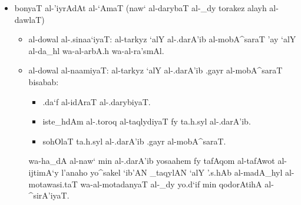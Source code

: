 \begin{itemize}
    \item bonyaT al-'iyrAdAt al-`AmaT (naw` al-darybaT al-_dy torakez alayh
        al-dawlaT)
    \begin{itemize}
        \item al-dowal al-.sinaa`iyaT: al-tarkyz `alY al-.darA'ib 
            al-mobA^saraT 'ay `alY al-da_hl wa-al-arbA.h wa-al-ra'smAl.
        \item al-dowal al-naamiyaT: al-tarkyz `alY al-.darA'ib .gayr
            al-mobA^saraT bisabab:
            \begin{itemize}
                \item .da`f al-idAraT al-.darybiyaT.
                \item iste_hdAm al-.toroq al-taqlydiyaT fy ta.h.syl al-.darA'ib.
                \item sohOlaT ta.h.syl al-.darA'ib .gayr al-mobA^saraT.
            \end{itemize}
            wa-ha_dA al-naw` min al-.darA'ib yosaahem fy tafAqom al-tafAwot 
            al-ijtimA`y l'anaho yo^sakel `ib'AN _taqylAN `alY '.s.hAb
            al-madA_hyl al-motawasi.taT wa-al-motadanyaT al-_dy yo.d`if min
            qodorAtihA al-^sirA'iyaT.
    \end{itemize}
\end{itemize}


